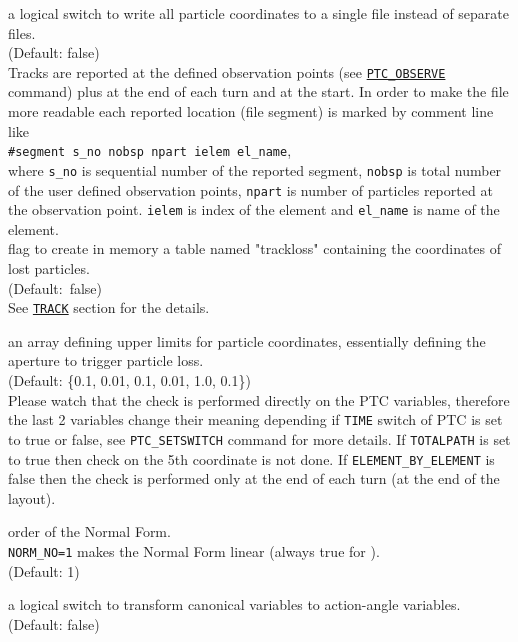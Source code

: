 \begin{madlist}
   \label{opt:onetable} a logical switch to write all 
	particle coordinates to a single file instead of separate files.\\
	(Default: false) \\
	Tracks are reported at the defined observation points
	(see \hyperref[sec:ptc-observe]{\texttt{PTC\_OBSERVE}} command)
	plus at the end of each turn and at the start.
	In order to make the file more readable each reported location (file segment)
	is marked by comment line like \\
	\texttt{\#segment s\_no nobsp npart ielem el\_name}, \\ where 
	\texttt{s\_no} is sequential number of the reported segment, 
	\texttt{nobsp} is total number of the user defined observation points, 
	\texttt{npart} is number of particles reported at the observation point.
	\texttt{ielem} is index of the element and 
	\texttt{el\_name} is name of the element.
	\\

    flag to create in memory a table named "trackloss"
   containing the coordinates of lost particles.\\
   (Default:~false) \\
   See \hyperref[sec:track]{\texttt{TRACK}} section for the details.

    an array defining upper limits for particle
   coordinates, essentially defining the aperture to trigger particle
   loss. \\ 
   (Default: \{0.1, 0.01, 0.1, 0.01, 1.0, 0.1\}) \\
   Please watch that the check is performed directly on the PTC variables, 
   therefore the last 2 variables change their meaning depending if 
   \texttt{TIME} switch of PTC is set to true or false, see 
   \texttt{PTC\_SETSWITCH} command for more details.
   If \texttt{TOTALPATH} is set to true then check on the 5th coordinate
   is not done.
   If \texttt{ELEMENT\_BY\_ELEMENT} is false then the check is performed
   only at the end of each turn (at the end of the layout). 
   

    order of the Normal Form.\\
   \texttt{NORM\_NO=1} makes the Normal Form linear (always true for
   \madx). \\ (Default: 1)

    a logical switch to transform canonical variables
   to action-angle variables. \\ (Default: false) 


\end{madlist}
